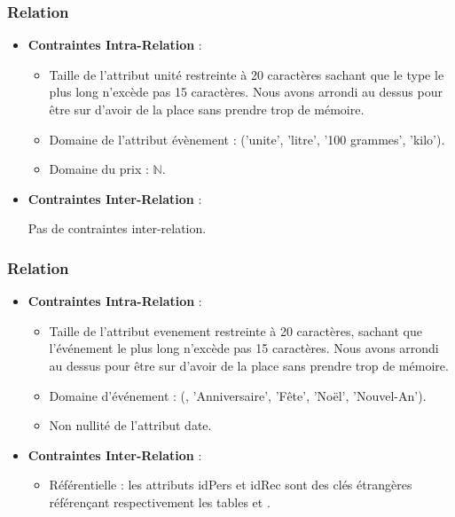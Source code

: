 \documentclass[a4paper,10pt]{report}
\begin{document}
 \subsubsection{Relation }
 
  \begin{itemize}
 	
	\item \textbf{Contraintes Intra-Relation} :
		\begin{itemize}
			\item Taille de l'attribut unité restreinte à 20 caractères sachant que le type le plus long n'excède pas 15 caractères. Nous avons arrondi au dessus pour être sur d'avoir de la place sans prendre trop de mémoire.
			\item Domaine de l'attribut évènement : ('unite', 'litre', '100 grammes', 'kilo').
			\item Domaine du prix : $\mathbb{N}$.\\
		 \end{itemize}
		 
 	\item  \textbf{Contraintes Inter-Relation} :
 	
 Pas de contraintes inter-relation.
 
 \end{itemize}
 	
 \subsubsection{Relation }
 
  \begin{itemize}
 	
	\item \textbf{Contraintes Intra-Relation} :
	 	\begin{itemize}
			\item Taille de l'attribut evenement restreinte à 20 caractères, sachant que l'événement le plus long n'excède pas 15 caractères. Nous avons arrondi au dessus pour être sur d'avoir de la place sans prendre trop de mémoire.
			\item Domaine d'événement : (, 'Anniversaire', 'Fête', 'Noël', 'Nouvel-An').
			\item Non nullité de l'attribut date.\\
		 \end{itemize}
		 
		 
 	\item  \textbf{Contraintes Inter-Relation} :
 			\begin{itemize}
			\item Référentielle : les attributs idPers et idRec sont des clés étrangères référençant respectivement les tables  et .
		 \end{itemize}
 \end{itemize}
 	
\end{document}
